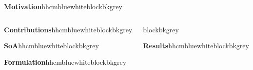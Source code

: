 \documentclass{beamer}
\begin{document}
	
	\begin{frame}[t]
		
			
		\begin{columns}[b]
			
			\begin{column}{0.955\textwidth}
				
				\begin{customblock}{\textbf{Motivation}}{hhcmblue}{white}{blockbkgrey}
					
					
					
				\end{customblock}
		
			\end{column}
		
		\end{columns}
			
		\begin{columns}[T] 

			\begin{column}{.46\textwidth}
				
				\begin{customblock}{\textbf{Contributions}}{hhcmblue}{white}{blockbkgrey}
					
				\end{customblock}
				
				\begin{customblock}{\textbf{SoA}}{hhcmblue}{white}{blockbkgrey}
					
				\end{customblock}
			
				\begin{customblock}{\textbf{Formulation}}{hhcmblue}{white}{blockbkgrey}
					
				\end{customblock}
				
			\end{column}
			
			\begin{column}{.46\textwidth}
				
				\begin{customblocknotitle}{blockbkgrey}
					
				\end{customblocknotitle}
			
				\begin{customblock}{\textbf{Results}}{hhcmblue}{white}{blockbkgrey}
					
				\end{customblock}
			

\end{column}
\end{columns}
\end{frame}
\end{document}
